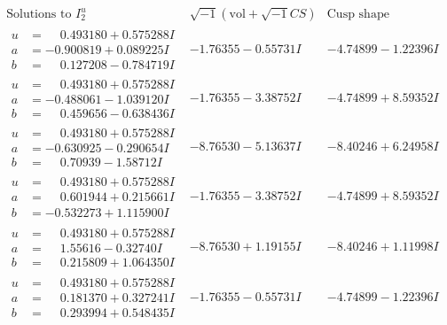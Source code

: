 \documentclass[1p]{elsarticle_modified}
\theoremstyle{definition}
\newcommand{\I}{\sqrt{-1}}
\begin{document}
$$\begin{array}{c|c|c}  
\text{Solutions to }I^u_{2}& \I (\text{vol} + \sqrt{-1}CS) & \text{Cusp shape}\\
 \hline 
\begin{aligned}
u &= \phantom{-}0.493180 + 0.575288 I \\
a &= -0.900819 + 0.089225 I \\
b &= \phantom{-}0.127208 - 0.784719 I\end{aligned}
 & -1.76355 - 0.55731 I & -4.74899 - 1.22396 I \\ \hline\begin{aligned}
u &= \phantom{-}0.493180 + 0.575288 I \\
a &= -0.488061 - 1.039120 I \\
b &= \phantom{-}0.459656 - 0.638436 I\end{aligned}
 & -1.76355 - 3.38752 I & -4.74899 + 8.59352 I \\ \hline\begin{aligned}
u &= \phantom{-}0.493180 + 0.575288 I \\
a &= -0.630925 - 0.290654 I \\
b &= \phantom{-}0.70939 - 1.58712 I\end{aligned}
 & -8.76530 - 5.13637 I & -8.40246 + 6.24958 I \\ \hline\begin{aligned}
u &= \phantom{-}0.493180 + 0.575288 I \\
a &= \phantom{-}0.601944 + 0.215661 I \\
b &= -0.532273 + 1.115900 I\end{aligned}
 & -1.76355 - 3.38752 I & -4.74899 + 8.59352 I \\ \hline\begin{aligned}
u &= \phantom{-}0.493180 + 0.575288 I \\
a &= \phantom{-}1.55616 - 0.32740 I \\
b &= \phantom{-}0.215809 + 1.064350 I\end{aligned}
 & -8.76530 + 1.19155 I & -8.40246 + 1.11998 I \\ \hline\begin{aligned}
u &= \phantom{-}0.493180 + 0.575288 I \\
a &= \phantom{-}0.181370 + 0.327241 I \\
b &= \phantom{-}0.293994 + 0.548435 I\end{aligned}
 & -1.76355 - 0.55731 I & -4.74899 - 1.22396 I \\ \hline\begin{aligned}

\end{aligned}
\end{array}$$
\end{document}

